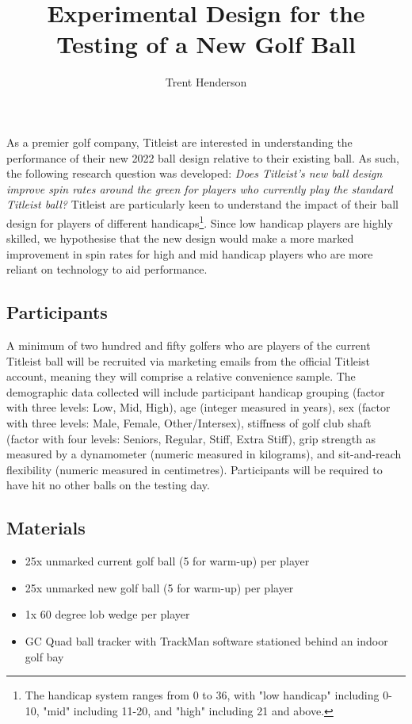 \documentclass{article}
\begin{document}
\title{\vspace{-4cm}Experimental Design for the Testing of a New Golf Ball}
\author{Trent Henderson}
\date{}

\maketitle

As a premier golf company, Titleist are interested in understanding the performance of their new 2022 ball design relative to their existing ball. 
As such, the following research question was developed: \textit{Does Titleist's new ball design improve spin rates around the green for players who currently play the standard Titleist ball?} 
Titleist are particularly keen to understand the impact of their ball design for players of different handicaps\footnote{The handicap system ranges from 0 to 36, with "low handicap" including 0-10, "mid" including 11-20, and "high" including 21 and above.}. 
Since low handicap players are highly skilled, we hypothesise that the new design would make a more marked improvement in spin rates for high and mid handicap players who are more reliant on technology to aid performance.

\subsection*{Participants}

A minimum of two hundred and fifty golfers who are players of the current Titleist ball will be recruited via marketing emails from the official Titleist account, meaning they will comprise a relative convenience sample. 
The demographic data collected will include participant handicap grouping (factor with three levels: Low, Mid, High), age (integer measured in years), sex (factor with three levels: Male, Female, Other/Intersex), stiffness of golf club shaft (factor with four levels: Seniors, Regular, Stiff, Extra Stiff), grip strength as measured by a dynamometer (numeric measured in kilograms), and sit-and-reach flexibility (numeric measured in centimetres).
Participants will be required to have hit no other balls on the testing day.

\subsection*{Materials}

\begin{itemize}
    \item 25x unmarked current golf ball (5 for warm-up) per player
    \item 25x unmarked new golf ball (5 for warm-up) per player
    \item 1x 60 degree lob wedge per player
    \item GC Quad ball tracker with TrackMan software stationed behind an indoor golf bay
\end{itemize}
\end{document}
